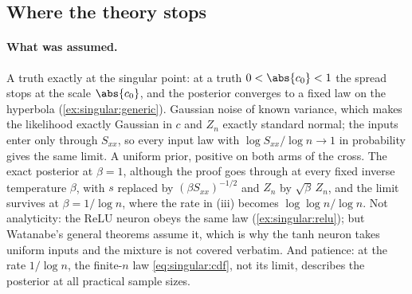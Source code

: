 \begin{refsection}
\section{Where the theory stops}\label{sec:singular:stops}

\paragraph{What was assumed.} A truth exactly at the singular point: at a truth $0<\abs{c_0}<1$ the spread stops at the scale $\abs{c_0}$, and the posterior converges to a fixed law on the hyperbola (\cref{ex:singular:generic}). Gaussian noise of known variance, which makes the likelihood exactly Gaussian in $c$ and $Z_n$ exactly standard normal; the inputs enter only through $S_{xx}$, so every input law with $\log S_{xx}/\log n\to1$ in probability gives the same limit. A uniform prior, positive on both arms of the cross. The exact posterior at $\beta=1$, although the proof goes through at every fixed inverse temperature $\beta$, with $s$ replaced by $(\beta S_{xx})^{-1/2}$ and $Z_n$ by $\sqrt\beta\,Z_n$, and the limit survives at $\beta=1/\log n$, where the rate in (iii) becomes $\log\log n/\log n$. Not analyticity: the ReLU neuron obeys the same law (\cref{ex:singular:relu}); but Watanabe's general theorems assume it, which is why the tanh neuron takes uniform inputs and the mixture is not covered verbatim. And patience: at the rate $1/\log n$, the finite-$n$ law \eqref{eq:singular:cdf}, not its limit, describes the posterior at all practical sample sizes.


\end{refsection}

